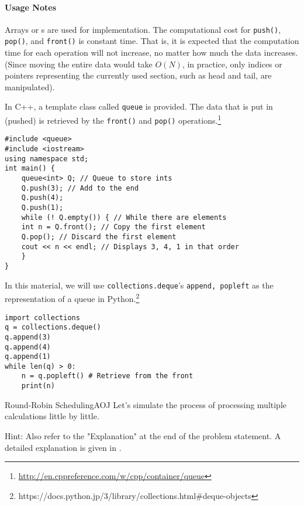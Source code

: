 \paragraph{Usage Notes}
Arrays or s are used for implementation.
The computational cost for \texttt{push()}, \texttt{pop()}, and \texttt{front()} is constant time. That is, it is expected that the computation time for each operation will not increase, no matter how much the data increases.
(Since moving the entire data would take $O(N)$, in practice, only indices or pointers representing the currently used section, such as head and tail, are manipulated).

In C++, a template class called \texttt{queue} is provided. The data that is put in (pushed) is retrieved by the \texttt{front()} and \texttt{pop()} operations.\footnote{\url{http://en.cppreference.com/w/cpp/container/queue}}
\begin{cbox}[emph={queue,push,front,pop}]
\begin{verbatim}
#include <queue>
#include <iostream>
using namespace std;
int main() {
    queue<int> Q; // Queue to store ints
    Q.push(3); // Add to the end
    Q.push(4);
    Q.push(1);
    while (! Q.empty()) { // While there are elements
	int n = Q.front(); // Copy the first element
	Q.pop(); // Discard the first element
	cout << n << endl; // Displays 3, 4, 1 in that order
    }
}
\end{verbatim}
\end{cbox}

In this material, we will use \texttt{collections.deque}'s \texttt{append, popleft} as the representation of a queue in Python.\footnote{https://docs.python.jp/3/library/collections.html\#deque-objects}
\begin{pybox}[emph={append,popleft}]
\begin{verbatim}
import collections
q = collections.deque()
q.append(3)
q.append(4)
q.append(1)
while len(q) > 0:
    n = q.popleft() # Retrieve from the front
    print(n)
\end{verbatim}
\end{pybox}


\begin{psbox}{Round-Robin Scheduling}{AOJ}
Let's simulate the process of processing multiple calculations little by little.
  
\end{psbox}

Hint: Also refer to the "Explanation" at the end of the problem statement. A detailed explanation is given in \pcaojbook[p.82].

